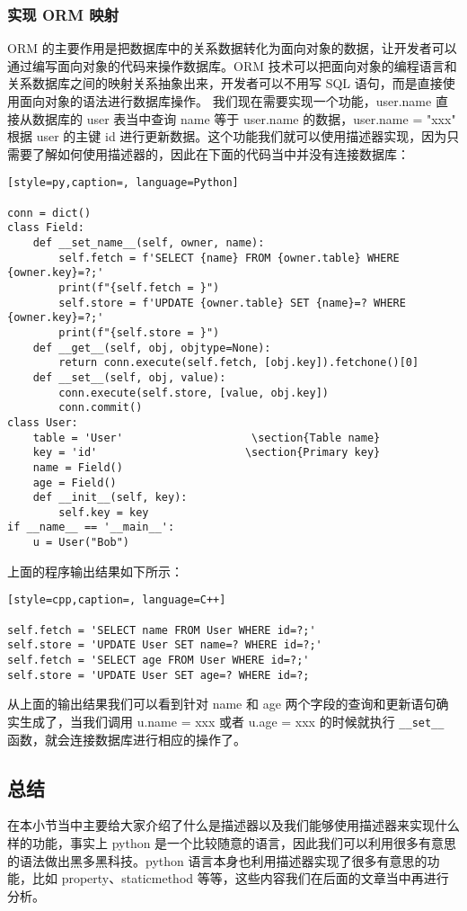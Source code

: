 \subsubsection{实现 ORM 映射}
ORM 的主要作用是把数据库中的关系数据转化为面向对象的数据，让开发者可以通过编写面向对象的代码来操作数据库。ORM 技术可以把面向对象的编程语言和关系数据库之间的映射关系抽象出来，开发者可以不用写 SQL 语句，而是直接使用面向对象的语法进行数据库操作。
我们现在需要实现一个功能，user.name 直接从数据库的 user 表当中查询 name 等于 user.name 的数据，user.name = "xxx" 根据 user 的主键 id 进行更新数据。这个功能我们就可以使用描述器实现，因为只需要了解如何使用描述器的，因此在下面的代码当中并没有连接数据库：
\begin{lstlisting}[style=py,caption=, language=Python]

conn = dict()
class Field:
    def __set_name__(self, owner, name):
        self.fetch = f'SELECT {name} FROM {owner.table} WHERE {owner.key}=?;'
        print(f"{self.fetch = }")
        self.store = f'UPDATE {owner.table} SET {name}=? WHERE {owner.key}=?;'
        print(f"{self.store = }")
    def __get__(self, obj, objtype=None):
        return conn.execute(self.fetch, [obj.key]).fetchone()[0]
    def __set__(self, obj, value):
        conn.execute(self.store, [value, obj.key])
        conn.commit()
class User:
    table = 'User'                    \section{Table name}
    key = 'id'                       \section{Primary key}
    name = Field()
    age = Field()
    def __init__(self, key):
        self.key = key
if __name__ == '__main__':
    u = User("Bob")
\end{lstlisting}
上面的程序输出结果如下所示：
\begin{lstlisting}[style=cpp,caption=, language=C++]

self.fetch = 'SELECT name FROM User WHERE id=?;'
self.store = 'UPDATE User SET name=? WHERE id=?;'
self.fetch = 'SELECT age FROM User WHERE id=?;'
self.store = 'UPDATE User SET age=? WHERE id=?;
\end{lstlisting}
从上面的输出结果我们可以看到针对 name 和 age 两个字段的查询和更新语句确实生成了，当我们调用 u.name = xxx 或者 u.age = xxx 的时候就执行 \verb|__set__| 函数，就会连接数据库进行相应的操作了。
\subsection{总结}
在本小节当中主要给大家介绍了什么是描述器以及我们能够使用描述器来实现什么样的功能，事实上 python 是一个比较随意的语言，因此我们可以利用很多有意思的语法做出黑多黑科技。python 语言本身也利用描述器实现了很多有意思的功能，比如 property、staticmethod 等等，这些内容我们在后面的文章当中再进行分析。